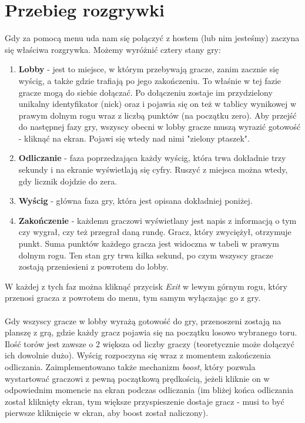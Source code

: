 \documentclass[]{report}
\begin{document}
\chapter*{Przebieg rozgrywki}
\quad Gdy za pomocą menu uda nam się połączyć z hostem (lub nim jesteśmy) zaczyna się właściwa rozgrywka. Możemy wyróżnić cztery stany gry:
\begin{enumerate}
	\item \textbf{Lobby} - jest to miejsce, w którym przebywają gracze, zanim zacznie się wyścig, a także gdzie trafiają po jego zakończeniu. To właśnie w tej fazie gracze mogą do siebie dołączać. Po dołączeniu zostaje im przydzielony unikalny identyfikator (nick) oraz i pojawia się on też w tablicy wynikowej w prawym dolnym rogu wraz z liczbą punktów (na początku zero). Aby przejść do następnej fazy gry, wszyscy obecni w lobby gracze muszą wyrazić gotowość - kliknąć na ekran. Pojawi się wtedy nad nimi "zielony ptaszek".
	\item \textbf{Odliczanie} - faza poprzedzająca każdy wyścig, która trwa dokładnie trzy sekundy i na ekranie wyświetlają się cyfry. Ruszyć z miejsca można wtedy, gdy licznik dojdzie do zera.
	\item \textbf{Wyścig} - główna faza gry, która jest opisana dokładniej poniżej.
	\item \textbf{Zakończenie} - każdemu graczowi wyświetlany jest napis z informacją o tym czy wygrał, czy też przegrał daną rundę. Gracz, który zwyciężył, otrzymuje punkt. Suma punktów każdego gracza jest widoczna w tabeli w prawym dolnym rogu. Ten stan gry trwa kilka sekund, po czym wszyscy gracze zostają przeniesieni z powrotem do lobby.
\end{enumerate}
W każdej z tych faz można kliknąć przycisk \textit{Exit} w lewym górnym rogu, który przenosi gracza z powrotem do menu, tym samym wyłączając go z gry. \\\\
Gdy wszyscy gracze w lobby wyrażą gotowość do gry, przenoszeni zostają na planszę z grą, gdzie każdy gracz pojawia się na początku losowo wybranego toru. Ilość torów jest zawsze o 2 większa od liczby graczy (teoretycznie może dołączyć ich dowolnie dużo).
Wyścig rozpoczyna się wraz z momentem zakończenia odliczania. Zaimplementowano także mechanizm \textit{boost}, który pozwala wystartować graczowi z pewną początkową prędkością, jeżeli kliknie on w odpowiednim momencie na ekran podczas odliczania (im bliżej końca odliczania został kliknięty ekran, tym większe przyspieszenie dostaje gracz - musi to być pierwsze kliknięcie w ekran, aby boost został naliczony).\\
\end{document}
